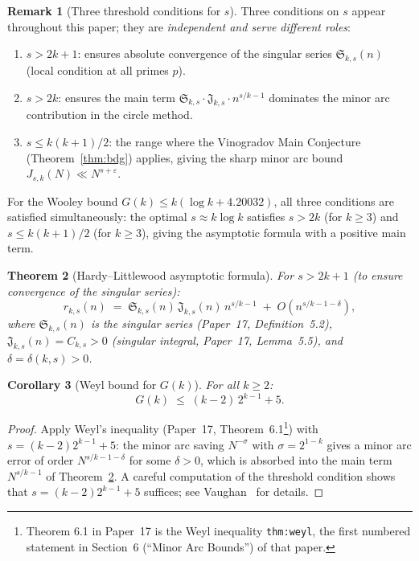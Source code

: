 \documentclass[12pt,a4paper]{amsart}
\newtheorem{theorem}{Theorem}[section]
\newtheorem{corollary}[theorem]{Corollary}
\theoremstyle{definition}
\newtheorem{remark}[theorem]{Remark}
\begin{document}
\begin{remark}[Three threshold conditions for $s$]
\label{rem:thresholds}
  Three conditions on $s$ appear throughout this paper; they are
  \emph{independent and serve different roles}:
  \begin{enumerate}
    \item $s > 2k+1$: ensures absolute convergence of the singular series
      $\mathfrak{S}_{k,s}(n)$ (local condition at all primes $p$).
    \item $s > 2k$: ensures the main term $\mathfrak{S}_{k,s} \cdot \mathfrak{J}_{k,s}
      \cdot n^{s/k-1}$ dominates the minor arc contribution in the circle method.
    \item $s \leq k(k+1)/2$: the range where the Vinogradov Main Conjecture
      (Theorem~\ref{thm:bdg}) applies, giving the sharp minor arc bound
      $J_{s,k}(N) \ll N^{s+\varepsilon}$.
  \end{enumerate}
  For the Wooley bound $G(k) \leq k(\log k + 4.20032)$, all three conditions
  are satisfied simultaneously: the optimal $s \approx k \log k$ satisfies
  $s > 2k$ (for $k \geq 3$) and $s \leq k(k+1)/2$ (for $k \geq 3$), giving
  the asymptotic formula with a positive main term.
\end{remark}

\begin{theorem}[Hardy--Littlewood asymptotic formula]\label{thm:HL}
  For $s > 2k + 1$ (to ensure convergence of the singular series):
  \[
    r_{k,s}(n)
    \;=\; \mathfrak{S}_{k,s}(n)\, \mathfrak{J}_{k,s}(n)\, n^{s/k - 1}
          \;+\; O\!\left(n^{s/k - 1 - \delta}\right),
  \]
  where $\mathfrak{S}_{k,s}(n)$ is the singular series (Paper~17,
  Definition~5.2), $\mathfrak{J}_{k,s}(n) = C_{k,s} > 0$ (singular integral,
  Paper~17, Lemma~5.5), and $\delta = \delta(k,s) > 0$.
\end{theorem}

\begin{corollary}[Weyl bound for $G(k)$]\label{cor:Gk_circle}
  For all $k \geq 2$:
  \[
    G(k) \;\leq\; (k-2)\,2^{k-1} + 5.
  \]
\end{corollary}

\begin{proof}
  Apply Weyl's inequality (Paper~17, Theorem~6.1\footnote{%
    Theorem 6.1 in Paper~17 is the Weyl inequality \texttt{thm:weyl}, the first numbered
    statement in Section~6 (``Minor Arc Bounds'') of that paper.}) with $s = (k-2)2^{k-1}+5$:
  the minor arc saving $N^{-\sigma}$ with $\sigma = 2^{1-k}$ gives a minor arc
  error of order $N^{s/k - 1 - \delta}$ for some $\delta > 0$, which is absorbed
  into the main term $N^{s/k - 1}$ of Theorem~\ref{thm:HL}.
  A careful computation of the threshold condition shows that $s = (k-2)2^{k-1}+5$
  suffices; see Vaughan~\cite[Chapter~5]{Vaughan1981} for details.
\end{proof}
\end{document}
